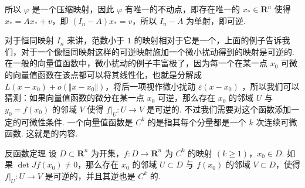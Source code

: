 所以 $\varphi$ 是一个压缩映射，因此 $\varphi$ 有唯一的不动点，即存在唯一的 $x_*\in \mathbf{R}^n$ 使得 $x_* = Ax_* + v$，即 $(I_n - A)x_* = v$，所以 $I_n - A$ 为单射，即可逆.

对于恒同映射 $I_n$ 来讲，范数小于 $1$ 的映射相对于它是一个，上面的例子告诉我们，对于一个像恒同映射这样的可逆映射施加一个微小扰动得到的映射是可逆的. 在一般的向量值函数中，微小扰动的例子丰富极了，因为每一个在某一点 $x_0$ 可微的向量值函数在该点都可以将其线性化，也就是分解成 $L(x - x_0) + o(\Vert x - x_0\Vert)$，将后一项视作微小扰动 $\varepsilon(x - x_0)$ ，所以我们可以猜测：如果向量值函数的微分在某一点 $x_0$ 可逆，那么存在 $x_0$ 的邻域 $U$ 与 $y_0 = f(x_0)$ 的邻域 $V$ 使得 $f|_U \colon U\to V$ 是可逆的. 不过我们需要对这个函数添加一定的可微性条件. 一个向量值函数是 $C^k$ 的是指其每个分量都是一个 $k$ 次连续可微函数. 这就是的内容.

\begin{theorem}{反函数定理}{}
    设 $D\subset \mathbf{R}^n$ 为开集，$f\colon D\to\mathbf{R}^n$ 为 $C^{k}$ 的映射 $(k\geqslant 1)$，$x_0\in D$. 如果 $\det Jf(x_0)\neq 0$，那么存在 $x_0$ 的邻域 $U\subset D$ 与 $f(x_0)$ 的邻域 $V\subset D$，使得 $f|_U \colon U\to V$ 是可逆的，并且其逆也是 $C^k$ 的.
\end{theorem}

